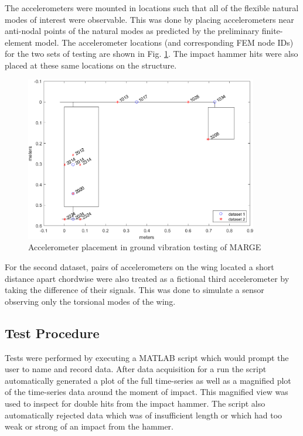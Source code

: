 The accelerometers were mounted in locations such that all of the flexible natural modes of interest were observable. This was done by placing accelerometers near anti-nodal points of the natural modes as predicted by the preliminary finite-element model. The accelerometer locations (and corresponding FEM node IDs) for the two sets of testing are shown in Fig. \ref{fig:accelPlacement}. The impact hammer hits were also placed at these same locations on the structure.
\begin{figure}[h]
    \centering
    \includegraphics[width=4in]{figs/GVT/accelLocPlot.png}
    \caption{Accelerometer placement in ground vibration testing of MARGE}
    \label{fig:accelPlacement}
\end{figure}

For the second dataset, pairs of accelerometers on the wing located a short distance apart chordwise were also treated as a fictional third accelerometer by taking the difference of their signals. This was done to simulate a sensor observing only the torsional modes of the wing.

\subsection{Test Procedure}

Tests were performed by executing a MATLAB script which would prompt the user to name and record data. After data acquisition for a run the script automatically generated a plot of the full time-series as well as a magnified plot of the time-series data around the moment of impact. This magnified view was used to inspect for double hits from the impact hammer. The script also automatically rejected data which was of insufficient length or which had too weak or strong of an impact from the hammer.

